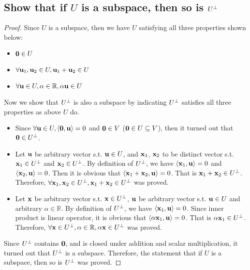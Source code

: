\documentclass[11pt,a4paper]{article}
\begin{document}
\subsection{Show that if $U$ is a subspace, then so is $U^{\perp}$}
\begin{proof}
    Since $U$ is a subspace, then we have $U$ satisfying all three properties
    shown below:
    \begin{itemize}
       \item $\mathbf{0} \in U$ 
       \item $\forall \mathbf{u}_1, \mathbf{u}_2 \in U, \mathbf{u}_1 + \mathbf{u}_2 \in U$
       \item $\forall \mathbf{u} \in U, \alpha \in \mathbb{R}, \alpha \mathbf{u} \in U$
    \end{itemize}
    Now we show that $U^{\perp}$ is also a subspace by indicating $U^{\perp}$
    satisfies all three properties as above $U$ do.
    \begin{itemize}
        \item Since $\forall \mathbf{u} \in U, \langle \mathbf{0}, \mathbf{u} \rangle = 0$
            and $\mathbf{0} \in V$ ($\mathbf{0} \in U \subseteq V$), then it
            turned out that $\mathbf{0} \in U^{\perp}$.
        \item Let $\mathbf{u}$ be arbitrary vector s.t. $\mathbf{u} \in U$, and
            $\mathbf{x}_1$, $\mathbf{x}_2$ to be distinct vector s.t. $\mathbf{x}_1 \in U^{\perp}$
            and $\mathbf{x}_2 \in U^{\perp}$. By definition of $U^{\perp}$, we have 
            $\langle \mathbf{x}_1, \mathbf{u} \rangle = 0$ and 
            $\langle \mathbf{x}_2, \mathbf{u} \rangle = 0$. 
            Then it is obvious that 
            $\langle \mathbf{x}_1 + \mathbf{x}_2, \mathbf{u} \rangle = 0$. 
            That is $\mathbf{x}_1 +\mathbf{x}_2 \in U^{\perp}$.
            Therefore, $\forall \mathbf{x}_1, \mathbf{x}_2 \in U^{\perp}, \mathbf{x}_1+\mathbf{x}_2 \in U^{\perp}$ was proved.
        \item Let $\mathbf{x}$ be arbitrary vector s.t. $\mathbf{x} \in U^{\perp}$, 
            $\mathbf{u}$ be arbitrary vector s.t. $\mathbf{u} \in U$ and
            arbitrary $\alpha \in \mathbb{R}$. By definition of $U^{\perp}$, we have 
            $\langle \mathbf{x}_1, \mathbf{u} \rangle = 0$. 
            Since inner product is linear operator, it is obvious that
            $\langle \alpha \mathbf{x}_1, \mathbf{u} \rangle = 0$. 
            That is $\alpha \mathbf{x}_1 \in U^{\perp}$.
            Therefore, $\forall \mathbf{x} \in U^{\perp}, \alpha \in \mathbb{R}, \alpha
            \mathbf{x} \in U^{\perp}$ was proved.
    \end{itemize}
    Since $U^{\perp}$ contains $\mathbf{0}$, and is closed under addition and scalar
    multiplication, it turned out that $U^{\perp}$ is a subspace. 
    Therefore, the statement that if $U$ is a subspace, then so is $U^{\perp}$ was
    proved.
\end{proof}
\end{document}
